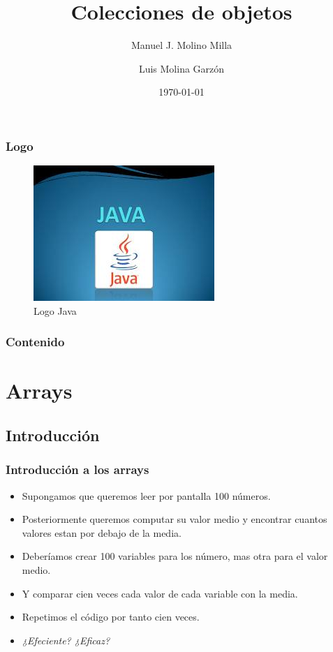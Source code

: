 \documentclass{beamer}
\title{Colecciones de objetos}
\author{Manuel J. Molino Milla \and Luis Molina Garzón}
\date{\today} %
\institute{IES Virgen del Carmen \and Departamento de Informática}
\begin{document}
\begin{frame}
  \titlepage
\end{frame}

\begin{frame}
    \frametitle{Logo}
\begin{figure}
\includegraphics[scale=1]{imagenes/logo.jpeg} 
\caption{Logo Java}
\end{figure}
\end{frame}

\begin{frame}
  \frametitle{Contenido}
  \tableofcontents[pausesections]
\end{frame}



\section{Arrays}

\subsection{Introducción}
\begin{frame}
\frametitle{Introducción a los arrays}
\begin{itemize}[<+->]
\item Supongamos que queremos leer por pantalla 100 números.
\item Posteriormente queremos computar su valor medio y encontrar cuantos valores estan por debajo de la media.
\item Deberíamos crear 100 variables para los  número, mas otra para el valor medio.
\item Y comparar cien veces cada valor de cada variable con la media.
\item Repetimos el código por tanto cien veces.
\item \emph{¿Efeciente? ¿Eficaz?}
\end{itemize}
\pause
\end{frame}
\end{document}
